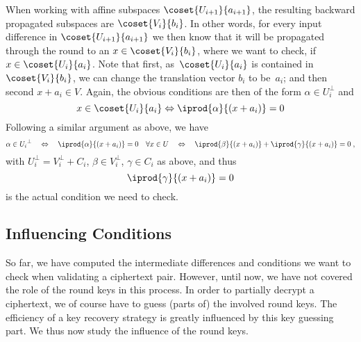 When working with affine subspaces $\coset{U_{i+1}}{a_{i+1}}$, the resulting backward propagated subspaces are $\coset{V_i}{b_i}$.
In other words, for every input difference in $\coset{U_{i+1}}{a_{i+1}}$ we then know that it will be propagated through the round to an $x \in \coset{V_i}{b_i}$, where we want to check, if $x \in \coset{U_i}{a_i}$.
Note that first, as~$\coset{U_i}{a_i}$ is contained in $\coset{V_i}{b_i}$, we can change the translation vector $b_i$ to be~$a_i$; and then second $x + a_i \in V$.
Again, the obvious conditions are then of the form $\alpha \in U_i^\perp$ and
\begin{equation*}
    x \in \coset{U_i}{a_i} \Leftrightarrow \iprod{\alpha}{(x + a_i)} = 0
\end{equation*}
Following a similar argument as above, we have
\begin{equation*}
    \alpha \in {U_i}^\perp
    \quad \Leftrightarrow \quad
    \iprod{\alpha}{(x + a_i)} = 0 \quad \forall x \in U
    \quad \Leftrightarrow \quad
    \iprod{\beta}{(x + a_i)} + \iprod{\gamma}{(x + a_i)} = 0\;,
\end{equation*}
with $U_i^\perp = V_i^\perp + C_i$, $\beta \in V_i^\perp$, $\gamma \in C_i$ as above, and thus
\begin{equation*}
    \iprod{\gamma}{(x + a_i)} = 0
\end{equation*}
is the actual condition we need to check.

\subsection{Influencing Conditions}
So far, we have computed the intermediate differences and conditions we want to check when validating a ciphertext pair.
However, until now, we have not covered the role of the round keys in this process.
In order to partially decrypt a ciphertext, we of course have to guess (parts of) the involved round keys.
The efficiency of a key recovery strategy is greatly influenced by this key guessing part.
We thus now study the influence of the round keys.

